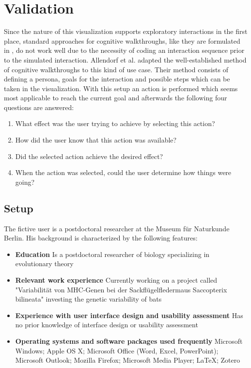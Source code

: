 %
\chapter{Validation}
\label{chap:validation}


Since the nature of this visualization supports exploratory interactions in the first place, standard approaches for cognitive walkthroughs, like they are formulated in \cite{whartonUsabilityInspectionMethods1994}, do not work well due to the necessity of coding an interaction sequence prior to the simulated interaction. Allendorf et al. \cite{allendoerferAdaptingCognitiveWalkthrough2005} adapted the well-established method of cognitive walkthroughs to this kind of use case. Their method consists of defining a persona, goals for the interaction and possible steps which can be taken in the visualization. With this setup an action is performed which seems most applicable to reach the current goal and afterwards the following four questions are answered:
\begin{enumerate}
	\item What effect was the user trying to achieve by selecting this action?
	\item How did the user know that this action was available?
	\item Did the selected action achieve the desired effect?
	\item When the action was selected, could the user determine how things were going?
\end{enumerate}

\section{Setup}
The fictive user is a postdoctoral researcher at the Museum für Naturkunde Berlin. His background is characterized by the following features:
\begin{itemize}
	\item \textbf{Education}
	Is a postdoctoral researcher of biology specializing in evolutionary theory
	
	\item \textbf{Relevant work experience}
	Currently working on a project called "Variabilität von MHC-Genen bei der Sackflügelfledermaus Saccopterix bilineata" investing the genetic variability of bats
	
	\item \textbf{Experience with user interface design and usability assessment}
	Has no prior knowledge of interface design or usability assessment
	
	\item \textbf{Operating systems and software packages used frequently}
	Microsoft Windows; Apple OS X; Microsoft Office
	(Word, Excel, PowerPoint); Microsoft Outlook; Mozilla Firefox;
	Microsoft Media Player; LaTeX; Zotero
\end{itemize}

